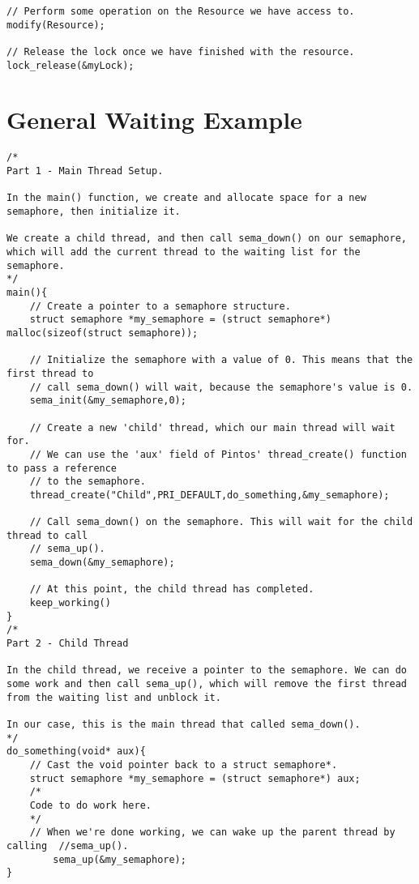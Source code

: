 \documentclass[11pt, letterpaper]{article}
\begin{document}
\begin{appendices}
\begin{lstlisting}[frame=single,basicstyle=\footnotesize]
// Perform some operation on the Resource we have access to.
modify(Resource);

// Release the lock once we have finished with the resource.
lock_release(&myLock);
\end{lstlisting}

\pagebreak

\section{General Waiting Example}
\begin{lstlisting}[frame=single,basicstyle=\footnotesize]
/*
Part 1 - Main Thread Setup.

In the main() function, we create and allocate space for a new semaphore, then initialize it. 

We create a child thread, and then call sema_down() on our semaphore, which will add the current thread to the waiting list for the semaphore.
*/
main(){
	// Create a pointer to a semaphore structure.
	struct semaphore *my_semaphore = (struct semaphore*) malloc(sizeof(struct semaphore));

	// Initialize the semaphore with a value of 0. This means that the first thread to
	// call sema_down() will wait, because the semaphore's value is 0.
	sema_init(&my_semaphore,0);

	// Create a new 'child' thread, which our main thread will wait for.
	// We can use the 'aux' field of Pintos' thread_create() function to pass a reference
	// to the semaphore.
	thread_create("Child",PRI_DEFAULT,do_something,&my_semaphore);
	
	// Call sema_down() on the semaphore. This will wait for the child thread to call
	// sema_up().
	sema_down(&my_semaphore);
	
	// At this point, the child thread has completed.
	keep_working()
}
/*
Part 2 - Child Thread

In the child thread, we receive a pointer to the semaphore. We can do some work and then call sema_up(), which will remove the first thread from the waiting list and unblock it.

In our case, this is the main thread that called sema_down().
*/
do_something(void* aux){
	// Cast the void pointer back to a struct semaphore*.
	struct semaphore *my_semaphore = (struct semaphore*) aux;
	/*
	Code to do work here.
	*/
	// When we're done working, we can wake up the parent thread by calling  //sema_up().
		sema_up(&my_semaphore);
}
\end{lstlisting}

\end{appendices}
\end{document}
